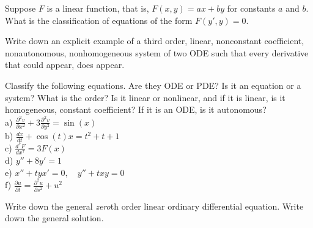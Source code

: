 \begin{exercise}
Suppose $F$ is a linear function, that is,
$F(x,y) = ax+by$ for constants $a$ and $b$.  What is the
classification of equations of the form $F(y',y) = 0$.
\end{exercise}

\begin{exercise}
Write down an explicit example of a third order, linear, nonconstant coefficient,
nonautonomous, nonhomogeneous system of two ODE such that every derivative
that could appear, does appear.
\end{exercise}

\setcounter{exercise}{100}

\begin{exercise}
Classify the following equations.  Are they ODE or PDE?  Is it an equation
or a system?  What is the order?  Is it linear or nonlinear, and if it is
linear, is it homogeneous, constant coefficient?  If it is an ODE, is it
autonomous?\\[3pt]
a) $\displaystyle \frac{\partial^2 v}{\partial x^2} + 3 \frac{\partial^2
v}{\partial y^2} = \sin(x)$ \\[3pt]
b) $\displaystyle \frac{d x}{dt} + \cos(t) x = t^2+t+1$ \\[3pt]
c) $\displaystyle \frac{d^7 F}{dx^7} = 3F(x)$ \\[3pt]
d) $\displaystyle y''+8y'=1$ \\[3pt]
e) $\displaystyle x''+tyx'=0, \quad y''+txy = 0$ \\[3pt]
f) $\displaystyle \frac{\partial u}{\partial t} = \frac{\partial^2 u}{\partial s^2} + u^2$
\end{exercise}

\begin{exercise}
Write down the general \emph{zero}th order linear ordinary differential
equation.  Write down the general solution.
\end{exercise}

